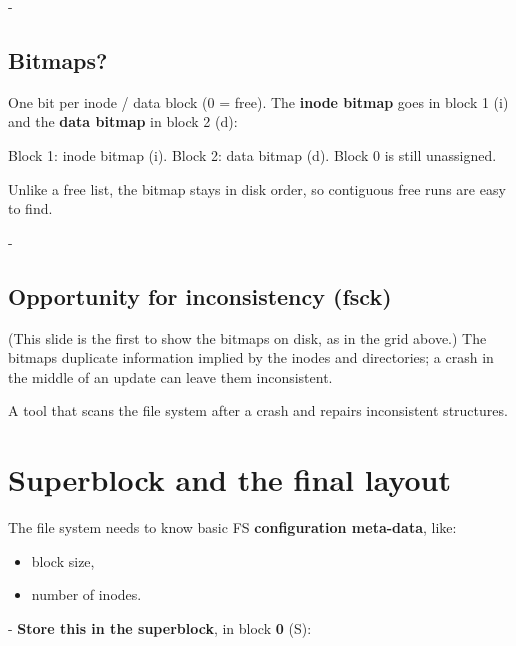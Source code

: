 \documentclass[11pt,a4paper]{article}
\makeatletter
\newcommand{\keepspace}[1]{\par\penalty-100\begingroup
  \setlength{\dimen@}{#1}\dimen@ii\pagegoal\advance\dimen@ii-\pagetotal
  \ifdim\dimen@>\dimen@ii\ifdim\dimen@ii>\z@\vfil\fi\break\fi\endgroup}
\newcommand{\fsgrid}[3]{%
  \foreach \bb in {0,...,63} {
    \pgfmathtruncatemacro{\rr}{\bb/16}
    \pgfmathtruncatemacro{\cc}{mod(\bb,16)}
    \pgfmathsetmacro{\xx}{\cc*0.71 + (\cc>7)*0.5}
    \ifnum\bb<8
      \node[blk, fill=white] (b\bb) at (\xx, -\rr*1.0) {};
    \else
      \node[blk, fill=#2] (b\bb) at (\xx, -\rr*1.0) {#1};
    \fi
  }
  \foreach \n/\l/\f in {#3} { \node[blk, \f] at (b\n) {\l}; }
  \foreach \rr in {0,...,3} {
    \foreach \s/\e in {0/7,8/15} {
      \pgfmathtruncatemacro{\bs}{\rr*16+\s}
      \pgfmathtruncatemacro{\be}{\rr*16+\e}
      \node[font=\scriptsize, inner sep=1pt, below=0pt of b\bs.south] {\bs};
      \node[font=\scriptsize, inner sep=1pt, below=0pt of b\be.south] {\be};
    }
  }
}
\makeatother
\begin{document}
\keepspace{8\baselineskip}
\subsection{Bitmaps?}\label{sec:bitmaps}

One bit per inode / data block (0 = free). The \textbf{inode bitmap} goes in
block 1 (i) and the \textbf{data bitmap} in block 2 (d):

\begin{center}

{\small Block 1: inode bitmap (i). Block 2: data bitmap (d). Block 0 is
still unassigned.}
\end{center}

Unlike a free list, the bitmap stays in disk order, so contiguous free runs
are easy to find.

\keepspace{8\baselineskip}
\subsection{Opportunity for inconsistency (fsck)}

(This slide is the first to show the bitmaps on disk, as in the grid above.)
The bitmaps duplicate information implied by the inodes and directories; a
crash in the middle of an update can leave them inconsistent.

\begin{defbox}
A tool that scans the file system after a crash and repairs inconsistent
structures.
\end{defbox}

\section{Superblock and the final layout}

The file system needs to know basic FS \textbf{configuration meta-data}, like:
\begin{itemize}
  \item block size,
  \item number of inodes.
\end{itemize}
\keepspace{8\baselineskip}
\noindent\textbf{Store this in the superblock}, in block \textbf{0} (S):
\end{document}
